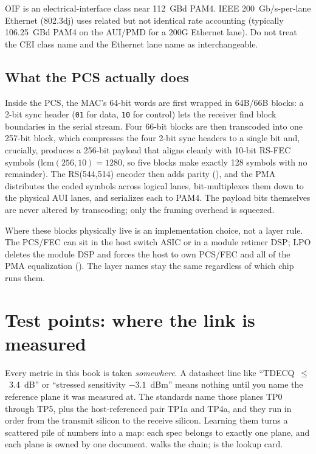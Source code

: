 OIF  is an electrical-interface class near 112~GBd PAM4. IEEE
200~Gb/s-per-lane Ethernet (802.3dj) uses related but not identical rate
accounting (typically 106.25~GBd PAM4 on the AUI/PMD for a 200G Ethernet lane).
Do not treat the CEI class name and the Ethernet lane name as interchangeable.

\subsection{What the PCS actually does}

Inside the PCS, the MAC's 64-bit words are first wrapped in 64B/66B blocks: a 2-bit
sync header (\texttt{01} for data, \texttt{10} for control) lets the receiver find
block boundaries in the serial stream. Four 66-bit blocks are then transcoded into
one 257-bit block, which compresses the four 2-bit sync headers to a single bit and,
crucially, produces a 256-bit payload that aligns cleanly with 10-bit RS-FEC symbols
($\mathrm{lcm}(256,10)=1280$, so five blocks make exactly 128 symbols with no
remainder). The RS(544,514) encoder then adds parity (), and the PMA
distributes the coded symbols across logical lanes, bit-multiplexes them down to the
physical AUI lanes, and serializes each to PAM4. The payload bits themselves are
never altered by transcoding; only the framing overhead is squeezed.

Where these blocks physically live is an implementation choice, not a layer rule.
The PCS/FEC can sit in the host switch ASIC or in a module retimer DSP; LPO deletes
the module DSP and forces the host to own PCS/FEC and all of the PMA equalization
(). The layer names stay the same regardless of
which chip runs them.


\section{Test points: where the link is measured}
\label{sec:test-points}

Every metric in this book is taken \emph{somewhere}. A datasheet line like
``TDECQ~$\le$~3.4~dB'' or ``stressed sensitivity $-3.1$~dBm'' means nothing until you
name the reference plane it was measured at. The standards name those planes TP0
through TP5, plus the host-referenced pair TP1a and TP4a, and they run in order from
the transmit silicon to the receive silicon. Learning them turns a scattered pile of
numbers into a map: each spec belongs to exactly one plane, and each plane is owned
by one document.  walks the chain; 
is the lookup card.

